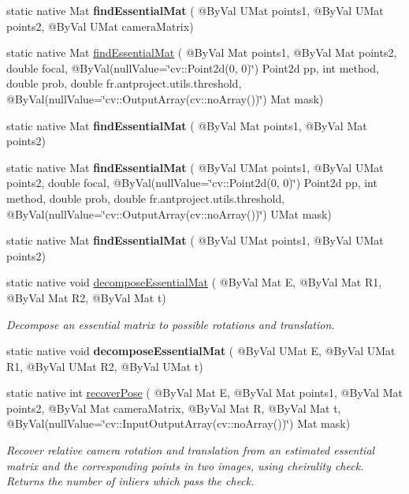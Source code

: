 \begin{DoxyCompactItemize}
\item 
static native Mat {\bfseries find\+Essential\+Mat} ( @By\+Val U\+Mat points1, @By\+Val U\+Mat points2, @By\+Val U\+Mat camera\+Matrix)
\item 
static native Mat \hyperlink{group__calib3d_gad36d1e3d84d08813292f71bad120f252}{find\+Essential\+Mat} ( @By\+Val Mat points1, @By\+Val Mat points2, double focal, @By\+Val(null\+Value=\char`\"{}cv\+::\+Point2d(0, 0)\char`\"{}) Point2d pp, int method, double prob, double fr.antproject.utils.threshold, @By\+Val(null\+Value=\char`\"{}cv\+::\+Output\+Array(cv\+::no\+Array())\char`\"{}) Mat mask)
\item 
static native Mat {\bfseries find\+Essential\+Mat} ( @By\+Val Mat points1, @By\+Val Mat points2)
\item 
static native Mat {\bfseries find\+Essential\+Mat} ( @By\+Val U\+Mat points1, @By\+Val U\+Mat points2, double focal, @By\+Val(null\+Value=\char`\"{}cv\+::\+Point2d(0, 0)\char`\"{}) Point2d pp, int method, double prob, double fr.antproject.utils.threshold, @By\+Val(null\+Value=\char`\"{}cv\+::\+Output\+Array(cv\+::no\+Array())\char`\"{}) U\+Mat mask)
\item 
static native Mat {\bfseries find\+Essential\+Mat} ( @By\+Val U\+Mat points1, @By\+Val U\+Mat points2)
\item 
static native void \hyperlink{group__calib3d_ga314b8ffe22b285bacf23b671e27d4495}{decompose\+Essential\+Mat} ( @By\+Val Mat E, @By\+Val Mat R1, @By\+Val Mat R2, @By\+Val Mat t)
\begin{DoxyCompactList}\small\item\em Decompose an essential matrix to possible rotations and translation. \end{DoxyCompactList}\item 
static native void {\bfseries decompose\+Essential\+Mat} ( @By\+Val U\+Mat E, @By\+Val U\+Mat R1, @By\+Val U\+Mat R2, @By\+Val U\+Mat t)
\item 
static native int \hyperlink{group__calib3d_gad7bafb76a3a077aa3ce1e3b98d475311}{recover\+Pose} ( @By\+Val Mat E, @By\+Val Mat points1, @By\+Val Mat points2, @By\+Val Mat camera\+Matrix, @By\+Val Mat R, @By\+Val Mat t, @By\+Val(null\+Value=\char`\"{}cv\+::\+Input\+Output\+Array(cv\+::no\+Array())\char`\"{}) Mat mask)
\begin{DoxyCompactList}\small\item\em Recover relative camera rotation and translation from an estimated essential matrix and the corresponding points in two images, using cheirality check. Returns the number of inliers which pass the check. \end{DoxyCompactList}\item 

\end{DoxyCompactItemize}
